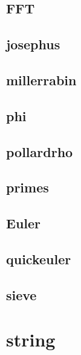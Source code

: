 \documentclass[a4paper,10pt,twocolumn,oneside]{article}
\begin{document}
    \subsection{FFT}
    

    \subsection{josephus}
    

    \vspace{1.2em}
    \vspace{1.2em}
    \subsection{millerrabin}
    

    \subsection{phi}
    

    \subsection{pollardrho}
    

    \subsection{primes}
    

    \subsection{Euler}
    

    \subsection{quickeuler}
    

    \subsection{sieve}
    

\section{string}
\end{document}
